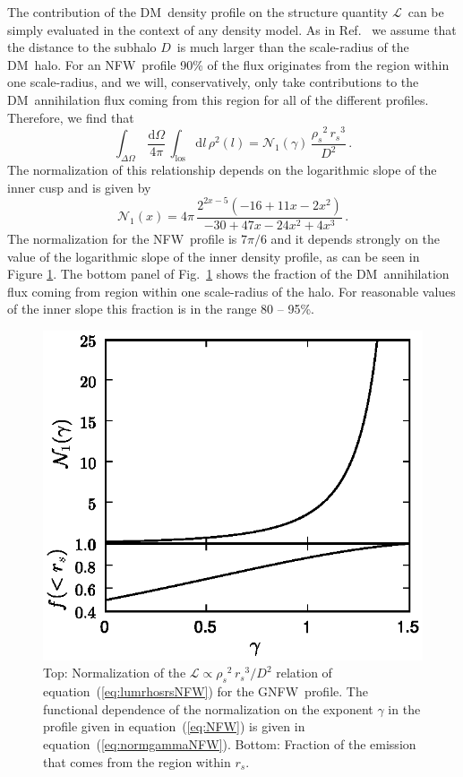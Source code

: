 \documentclass[aps,prd,twocolumn,amsmath,amssymb,floatfix,nofootinbib,10pt]{revtex4}
\newcommand{\NFW}{NFW}
\newcommand{\GNFW}{G\NFW}
\newcommand{\DM}{DM}
\newcommand{\dd}{\mathrm{d}}
\newcommand{\eqnname}{equation}
\newcommand{\los}{los}
\newcommand{\lum}{\ensuremath{\mathcal{L}}}
\newcommand{\rhos}{\ensuremath{\rho_s}}
\newcommand{\rs}{\ensuremath{r_s}}
\newcommand{\dist}{\ensuremath{D}}
\newcommand{\norm}{\ensuremath{\mathcal{N}}}
\newcommand{\normnfw}{\ensuremath{\norm_1}}
\begin{document}
The contribution of the \DM\ density profile on the structure quantity
\lum\ can be simply evaluated in the context of any density model. As
in Ref.~\cite{2007PhRvD..75h3526S} we assume that the distance to the
subhalo \dist\ is much larger than the scale-radius of the \DM\
halo. For an \NFW\ profile 90\% of the flux originates from the region
within one scale-radius, and we will, conservatively, only take
contributions to the \DM\ annihilation flux coming from this region
for all of the different profiles. Therefore, we find that
\begin{equation}\label{eq:lumrhosrsNFW}
\int_{\Delta\Omega}\,\frac{\dd\Omega}{4\pi}\,\int_{\mathrm{\los}} \dd
l\, \rho^2(l)= \normnfw(\gamma)\, \frac{\rhos^2\, \rs^3}{\dist^2}\, .
\end{equation}
The normalization of this relationship depends on the logarithmic
slope of the inner cusp and is given by
\begin{equation}\label{eq:normgammaNFW}
\normnfw(x) = 4 \pi  \, \frac{2^{2x-5}\left(-16+11x-2x^2\right)}{-30+47x-24x^2+4x^3}\, .
\end{equation}
The normalization for the \NFW\ profile is $7\pi/6$ and it depends
strongly on the value of the logarithmic slope of the inner density
profile, as can be seen in Figure \ref{fig:normgammaNFW}. The bottom
panel of Fig.~\ref{fig:normgammaNFW} shows the fraction of the \DM\
annihilation flux coming from region within one scale-radius of the
halo. For reasonable values of the inner slope this fraction is in the
range 80 -- 95\%.

\begin{figure}[t]
\centering
\includegraphics{normgammaNFW.eps}
\caption{Top: Normalization of the $\lum \propto \rhos^2\,
\rs^3/\dist^2$ relation of \eqnname\ (\ref{eq:lumrhosrsNFW}) for the
\GNFW\ profile. The functional dependence of the normalization on the
exponent $\gamma$ in the profile given in \eqnname\ (\ref{eq:NFW}) is
given in \eqnname\ (\ref{eq:normgammaNFW}). Bottom: Fraction of the
emission that comes from the region within \rs.}%
\label{fig:normgammaNFW}%
\end{figure}
\end{document}
